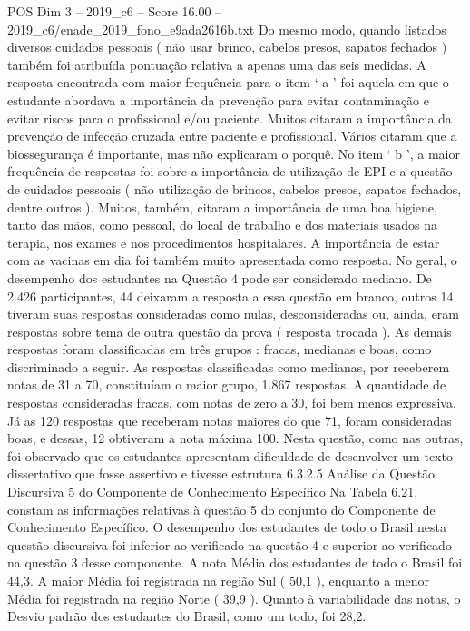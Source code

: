 \begin{textsample}{POS Dim 3 – 2019\_c6 – Score 16.00 – 2019\_c6/enade\_2019\_fono\_e9ada2616b.txt}
Do mesmo modo, quando listados diversos cuidados pessoais ( não usar brinco, cabelos presos, sapatos fechados ) também foi atribuída pontuação relativa a apenas uma das seis medidas.
A resposta encontrada com maior frequência para o item ‘ a ’ foi aquela em que o estudante abordava a importância da prevenção para evitar contaminação e evitar riscos para o profissional e/ou paciente.
Muitos citaram a importância da prevenção de infecção cruzada entre paciente e profissional.
Vários citaram que a biossegurança é importante, mas não explicaram o porquê.
No item ‘ b ’, a maior frequência de respostas foi sobre a importância de utilização de EPI e a questão de cuidados pessoais ( não utilização de brincos, cabelos presos, sapatos fechados, dentre outros ).
Muitos, também, citaram a importância de uma boa higiene, tanto das mãos, como pessoal, do local de trabalho e dos materiais usados na terapia, nos exames e nos procedimentos hospitalares.
A importância de estar com as vacinas em dia foi também muito apresentada como resposta.
No geral, o desempenho dos estudantes na Questão 4 pode ser considerado mediano.
De 2.426 participantes, 44 deixaram a resposta a essa questão em branco, outros 14 tiveram suas respostas consideradas como nulas, desconsideradas ou, ainda, eram respostas sobre tema de outra questão da prova ( resposta trocada ).
As demais respostas foram classificadas em três grupos : fracas, medianas e boas, como discriminado a seguir.
As respostas classificadas como medianas, por receberem notas de 31 a 70, constituíam o maior grupo, 1.867 respostas.
A quantidade de respostas consideradas fracas, com notas de zero a 30, foi bem menos expressiva.
Já as 120 respostas que receberam notas maiores do que 71, foram consideradas boas, e dessas, 12 obtiveram a nota máxima 100.
Nesta questão, como nas outras, foi observado que os estudantes apresentam dificuldade de desenvolver um texto dissertativo que fosse assertivo e tivesse estrutura 6.3.2.5 Análise da Questão Discursiva 5 do Componente de Conhecimento Específico Na Tabela 6.21, constam as informações relativas à questão 5 do conjunto do Componente de Conhecimento Específico.
O desempenho dos estudantes de todo o Brasil nesta questão discursiva foi inferior ao verificado na questão 4 e superior ao verificado na questão 3 desse componente.
A nota Média dos estudantes de todo o Brasil foi 44,3.
A maior Média foi registrada na região Sul ( 50,1 ), enquanto a menor Média foi registrada na região Norte ( 39,9 ).
Quanto à variabilidade das notas, o Desvio padrão dos estudantes do Brasil, como um todo, foi 28,2.

\end{textsample}
